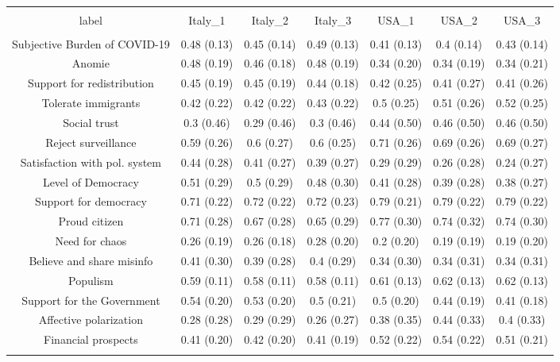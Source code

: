 
\begin{table}[!htbp] \centering 
  \caption{} 
  \label{} 
\begin{tabular}{@{\extracolsep{5pt}} ccccccc} 
\\[-1.8ex]\hline 
\hline \\[-1.8ex] 
label & Italy\_1 & Italy\_2 & Italy\_3 & USA\_1 & USA\_2 & USA\_3 \\ 
\hline \\[-1.8ex] 
Subjective Burden of COVID-19 & 0.48 (0.13) & 0.45 (0.14) & 0.49 (0.13) & 0.41 (0.13) & 0.4 (0.14) & 0.43 (0.14) \\ 
Anomie & 0.48 (0.19) & 0.46 (0.18) & 0.48 (0.19) & 0.34 (0.20) & 0.34 (0.19) & 0.34 (0.21) \\ 
Support for redistribution & 0.45 (0.19) & 0.45 (0.19) & 0.44 (0.18) & 0.42 (0.25) & 0.41 (0.27) & 0.41 (0.26) \\ 
Tolerate immigrants & 0.42 (0.22) & 0.42 (0.22) & 0.43 (0.22) & 0.5 (0.25) & 0.51 (0.26) & 0.52 (0.25) \\ 
Social trust & 0.3 (0.46) & 0.29 (0.46) & 0.3 (0.46) & 0.44 (0.50) & 0.46 (0.50) & 0.46 (0.50) \\ 
Reject surveillance & 0.59 (0.26) & 0.6 (0.27) & 0.6 (0.25) & 0.71 (0.26) & 0.69 (0.26) & 0.69 (0.27) \\ 
Satisfaction with pol. system & 0.44 (0.28) & 0.41 (0.27) & 0.39 (0.27) & 0.29 (0.29) & 0.26 (0.28) & 0.24 (0.27) \\ 
Level of Democracy & 0.51 (0.29) & 0.5 (0.29) & 0.48 (0.30) & 0.41 (0.28) & 0.39 (0.28) & 0.38 (0.27) \\ 
Support for democracy & 0.71 (0.22) & 0.72 (0.22) & 0.72 (0.23) & 0.79 (0.21) & 0.79 (0.22) & 0.79 (0.22) \\ 
Proud citizen & 0.71 (0.28) & 0.67 (0.28) & 0.65 (0.29) & 0.77 (0.30) & 0.74 (0.32) & 0.74 (0.30) \\ 
Need for chaos & 0.26 (0.19) & 0.26 (0.18) & 0.28 (0.20) & 0.2 (0.20) & 0.19 (0.19) & 0.19 (0.20) \\ 
Believe and share misinfo & 0.41 (0.30) & 0.39 (0.28) & 0.4 (0.29) & 0.34 (0.30) & 0.34 (0.31) & 0.34 (0.31) \\ 
Populism & 0.59 (0.11) & 0.58 (0.11) & 0.58 (0.11) & 0.61 (0.13) & 0.62 (0.13) & 0.62 (0.13) \\ 
Support for the Government & 0.54 (0.20) & 0.53 (0.20) & 0.5 (0.21) & 0.5 (0.20) & 0.44 (0.19) & 0.41 (0.18) \\ 
Affective polarization & 0.28 (0.28) & 0.29 (0.29) & 0.26 (0.27) & 0.38 (0.35) & 0.44 (0.33) & 0.4 (0.33) \\ 
Financial prospects & 0.41 (0.20) & 0.42 (0.20) & 0.41 (0.19) & 0.52 (0.22) & 0.54 (0.22) & 0.51 (0.21) \\ 
\hline \\[-1.8ex] 
\end{tabular} 
\end{table} 
